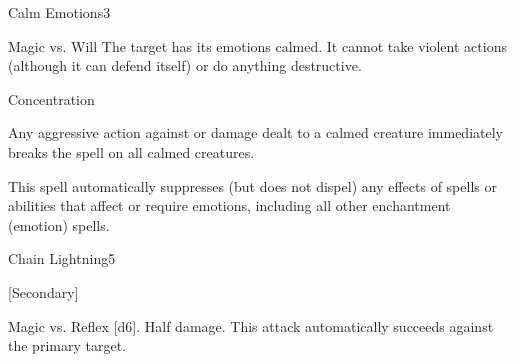\begin{spellsection}{Calm Emotions}{3}
\begin{spellheader}
\end{spellheader}
\begin{spellcontent}
    \begin{spelltargetinginfo}
    \end{spelltargetinginfo}
    \begin{spelleffects}
        \begin{spellattack}{Magic vs. Will}
            \spellsuccess The target has its emotions calmed. It cannot take violent actions (although it can defend itself) or do anything destructive.
        \end{spellattack}
        \spelldur Concentration
    \end{spelleffects}
\end{spellcontent}
\begin{spellfooter}
    \spellnotes Any aggressive action against or damage dealt to a calmed creature immediately breaks the spell on all calmed creatures.

    This spell automatically suppresses (but does not dispel) any effects of spells or abilities that affect or require emotions, including all other enchantment (emotion) spells.
\end{spellfooter}
\end{spellsection}

\begin{spellsection}{Chain Lightning}{5}
\begin{spellheader}
\end{spellheader}
\begin{spellcontent}
    \begin{spelltargetinginfo}
        [Secondary]
    \end{spelltargetinginfo}
    \begin{spelleffects}
        \begin{spellattack}{Magic vs. Reflex}
            \spellsuccess {}[d6].
            \spellfailure Half damage.
            \spellspecial This attack automatically succeeds against the primary target.
        \end{spellattack}
    \end{spelleffects}
\end{spellcontent}
\begin{spellfooter}
\end{spellfooter}
\end{spellsection}

